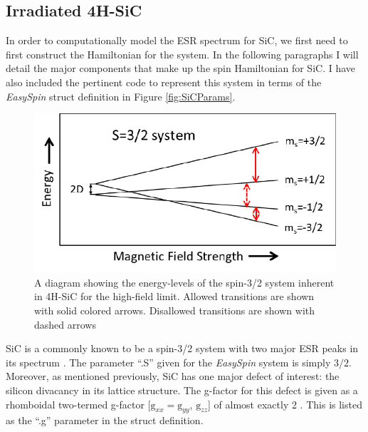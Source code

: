 \documentclass[oneside, noacknowlegments]{BYUPhys}
\begin{document}
\subsection{Irradiated 4H-SiC}

In order to computationally model the ESR spectrum for SiC, we first need to first construct the Hamiltonian for the system. In the following paragraphs I will detail the major components that make up the spin Hamiltonian for SiC. I have also included the pertinent code to represent this system in terms of the \textit{EasySpin} struct definition in Figure \ref{fig:SiCParams}.

\begin{figure}
    \centerline{\includegraphics{energy_levels_fig}}
    \caption[Energy Levels of 4H-SiC]{\label{fig:SiCEnergyLevels}
     A diagram showing the energy-levels of the spin-3/2 system inherent in 4H-SiC for the high-field limit. Allowed transitions are shown with solid colored arrows. Disallowed transitions are shown with dashed arrows}
 \end{figure}

SiC is a commonly known to be a spin-3/2 system with two major ESR peaks in its spectrum \cite{RefWorks:doc:5892964ee4b0499fa95c5108}. The parameter ``.S'' given for the \textit{EasySpin} system is simply $3/2$. Moreover, as mentioned previously, SiC has one major defect of interest: the silicon divacancy \cite{RefWorks:doc:58929800e4b0499fa95c51a1} \cite{RefWorks:doc:589297a9e4b0d4c09201f736} in its lattice structure. The g-factor for this defect is given as a rhomboidal two-termed g-factor [$\text{g}_{xx}=\text{g}_{yy}$, $\text{g}_{zz}$] of almost exactly 2 \cite{RefWorks:doc:5892964ee4b0499fa95c5108}. This is listed as the ``.g'' parameter in the struct definition.
\end{document}
